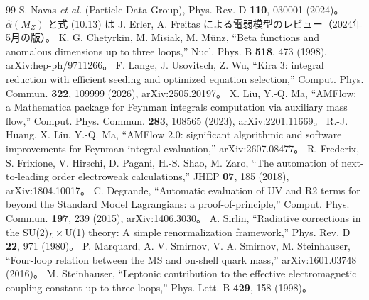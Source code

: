 \documentclass[a4paper,10pt]{ltjsarticle}
\begin{document}
\begin{thebibliography}{99}
 S. Navas \textit{et al.} (Particle Data Group), Phys. Rev. D \textbf{110}, 030001 (2024)。$\hat\alpha(M_Z)$ と式 (10.13) は J. Erler, A. Freitas による電弱模型のレビュー（2024年5月の版）。
 K. G. Chetyrkin, M. Misiak, M. Münz, ``Beta functions and anomalous dimensions up to three loops,'' Nucl. Phys. B \textbf{518}, 473 (1998), arXiv:hep-ph/9711266。
 F. Lange, J. Usovitsch, Z. Wu, ``Kira 3: integral reduction with efficient seeding and optimized equation selection,'' Comput. Phys. Commun. \textbf{322}, 109999 (2026), arXiv:2505.20197。
 X. Liu, Y.-Q. Ma, ``AMFlow: a Mathematica package for Feynman integrals computation via auxiliary mass flow,'' Comput. Phys. Commun. \textbf{283}, 108565 (2023), arXiv:2201.11669。
 R.-J. Huang, X. Liu, Y.-Q. Ma, ``AMFlow 2.0: significant algorithmic and software improvements for Feynman integral evaluation,'' arXiv:2607.08477。
 R. Frederix, S. Frixione, V. Hirschi, D. Pagani, H.-S. Shao, M. Zaro, ``The automation of next-to-leading order electroweak calculations,'' JHEP \textbf{07}, 185 (2018), arXiv:1804.10017。
 C. Degrande, ``Automatic evaluation of UV and R2 terms for beyond the Standard Model Lagrangians: a proof-of-principle,'' Comput. Phys. Commun. \textbf{197}, 239 (2015), arXiv:1406.3030。
 A. Sirlin, ``Radiative corrections in the SU(2)$_L\times$U(1) theory: A simple renormalization framework,'' Phys. Rev. D \textbf{22}, 971 (1980)。
 P. Marquard, A. V. Smirnov, V. A. Smirnov, M. Steinhauser, ``Four-loop relation between the $\overline{\mathrm{MS}}$ and on-shell quark mass,'' arXiv:1601.03748 (2016)。
 M. Steinhauser, ``Leptonic contribution to the effective electromagnetic coupling constant up to three loops,'' Phys. Lett. B \textbf{429}, 158 (1998)。
\end{thebibliography}
\end{document}
